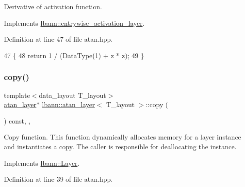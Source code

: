 Derivative of activation function. 

Implements \hyperlink{classlbann_1_1entrywise__activation__layer_a7676a4c5060452a38264993554e79f8e}{lbann\+::entrywise\+\_\+activation\+\_\+layer}.



Definition at line 47 of file atan.\+hpp.


\begin{DoxyCode}
47                                                             \{
48     \textcolor{keywordflow}{return} 1 / (DataType(1) + z * z);
49   \}
\end{DoxyCode}
\mbox{\label{classlbann_1_1atan__layer_accb8ca944735c1c7acccecc188fe100b}} 
\subsubsection{\texorpdfstring{copy()}{copy()}}
{\footnotesize\ttfamily template$<$data\+\_\+layout T\+\_\+layout$>$ \\
\hyperlink{classlbann_1_1atan__layer}{atan\+\_\+layer}$\ast$ \hyperlink{classlbann_1_1atan__layer}{lbann\+::atan\+\_\+layer}$<$ T\+\_\+layout $>$\+::copy (\begin{DoxyParamCaption}{ }\end{DoxyParamCaption}) const\hspace{0.3cm}{\ttfamily [inline]}, {\ttfamily [override]}, {\ttfamily [virtual]}}

Copy function. This function dynamically allocates memory for a layer instance and instantiates a copy. The caller is responsible for deallocating the instance. 

Implements \hyperlink{classlbann_1_1Layer_af420f22bbac801c85483ade84588a23f}{lbann\+::\+Layer}.



Definition at line 39 of file atan.\+hpp.


